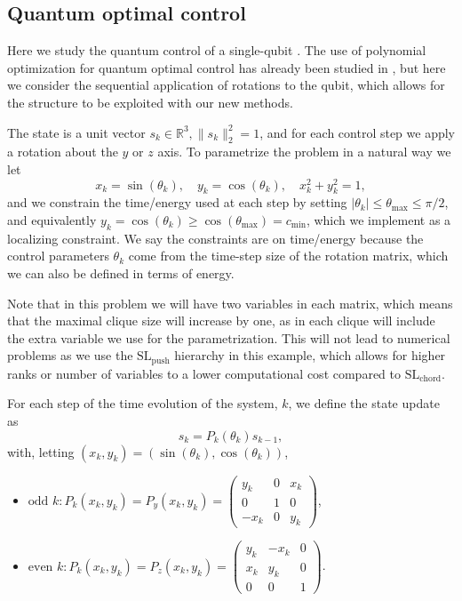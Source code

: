 \documentclass[11pt,a4paper]{article}
\newcommand{\R}{\mathbb R}
\theoremstyle{definition}
\begin{document}
\subsection{Quantum optimal control}

Here we study the quantum control of a single-qubit \cite{Glaser_2015}. The use of polynomial optimization for quantum optimal control has already been studied in \cite{qcpop,ugs}, but here we consider the sequential application of rotations to the qubit, which allows for the structure to be exploited with our new methods.

The state is a unit vector $s_k \in \R^3, \|s_k\|_2^2=1$, and for each control step we apply a rotation about the $y$ or $z$ axis. To parametrize the problem in a natural way we let 
\[
x_k=\sin(\theta_k), \quad y_k=\cos(\theta_k),\quad x_k^2+y_k^2=1,
\]
and we constrain the time/energy used at each step by setting $|\theta_k|\leq \theta_{\text{max}}\leq \pi/2$, and equivalently $y_k=\cos(\theta_k)\geq \cos(\theta_{\text{max}})=c_{\text{min}}$, which we implement as a localizing constraint. We say the constraints are on time/energy because the control parameters $\theta_k$ come from the time-step size of the rotation matrix, which we can also be defined in terms of energy.

Note that in this problem we will have two variables in each matrix, which means that the maximal clique size will increase by one, as in each clique will include the extra variable we use for the parametrization. This will not lead to numerical problems as we use the $\mathrm{SL}_{\mathrm{push}}$ hierarchy in this example, which allows for higher ranks or number of variables to a lower computational cost compared to $\mathrm{SL}_{\mathrm{chord}}$.

For each step of the time evolution of the system, $k$, we define the state update as 
\begin{equation}
    s_k=P_k(\theta_k)s_{k-1},
\end{equation}
with, letting $(x_k,y_k)=(\sin(\theta_k),\cos(\theta_k))$,
\begin{itemize}
    \item $\text{odd }k: P_k(x_k,y_k)= P_y(x_k,y_k)=\begin{pmatrix}
        y_k & 0 & x_k \\ 0 & 1& 0 \\
        -x_k &0 & y_k
    \end{pmatrix}$,
    \item $\text{even } k:P_k(x_k,y_k)= P_z(x_k,y_k)=\begin{pmatrix}
        y_k & - x_k & 0 \\ 
        x_k & y_k & 0 \\ 0 & 0 & 1
    \end{pmatrix}$.
\end{itemize}
\end{document}
